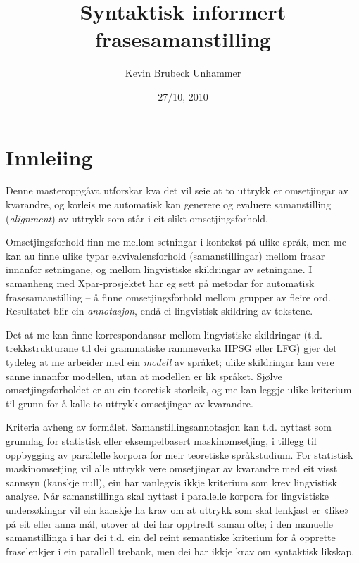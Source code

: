 \documentclass[11pt,a4paper,oneside,draft]{book}
\title{Syntaktisk informert frasesamanstilling }
\author{Kevin Brubeck Unhammer}
\date{27/10, 2010}
\begin{document}
\maketitle

\setcounter{tocdepth}{4}
\tableofcontents
\vspace*{1cm}


\chapter{Innleiing}
\label{sec-1}

\label{SEC:innleiing}


Denne masteroppgåva utforskar kva det vil seie at to uttrykk er
omsetjingar av kvarandre, og korleis me automatisk kan generere og
evaluere samanstilling (\emph{alignment}) av uttrykk som
står i eit slikt omsetjingsforhold. 

Omsetjingsforhold finn me mellom setningar i kontekst på ulike språk,
men me kan au finne ulike typar ekvivalensforhold (samanstillingar)
mellom frasar innanfor setningane, og mellom lingvistiske
skildringar av setningane. I samanheng med Xpar-prosjektet
\citep{xpar2008rcn} har eg sett på metodar for automatisk
frasesamanstilling – å finne omsetjingsforhold mellom grupper av
fleire ord. Resultatet blir ein \emph{annotasjon}, endå ei lingvistisk
skildring av tekstene.



Det at me kan finne korrespondansar mellom lingvistiske skildringar
(t.d. trekkstrukturane til dei grammatiske rammeverka HPSG eller LFG)
gjer det tydeleg at me arbeider med ein \emph{modell} av språket; ulike
skildringar kan vere sanne innanfor modellen, utan at modellen er lik
språket. Sjølve omsetjingsforholdet er au ein teoretisk storleik, og
me kan leggje ulike kriterium til grunn for å kalle to uttrykk
omsetjingar av kvarandre.

Kriteria avheng av formålet. Samanstillingsannotasjon kan t.d. nyttast
som grunnlag for statistisk eller eksempelbasert maskinomsetjing, i
tillegg til oppbygging av parallelle korpora for meir teoretiske
språkstudium.  For statistisk maskinomsetjing vil alle uttrykk vere
omsetjingar av kvarandre med eit visst sannsyn (kanskje null), ein
har vanlegvis ikkje kriterium som krev lingvistisk analyse. Når
samanstillinga skal nyttast i parallelle korpora for lingvistiske
undersøkingar vil ein kanskje ha krav om at uttrykk som skal lenkjast
er «like» på eit eller anna mål, utover at dei har opptredt saman
ofte; i den manuelle samanstillinga i \citet{samuelsson2006pap} har
dei t.d. ein del reint semantiske kriterium for å opprette
fraselenkjer i ein parallell trebank, men dei har ikkje krav om
syntaktisk likskap.
\end{document}
